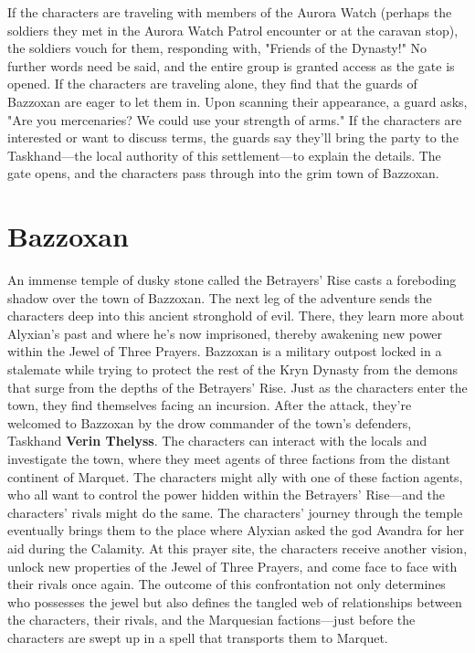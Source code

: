 \documentclass[10pt,a4,twoside,twocolumn,openany,nodeprecatedcode]{dndbook}
\begin{document}
If the characters are traveling with members of the Aurora Watch (perhaps the soldiers they met in the Aurora Watch Patrol encounter or at the caravan stop), the soldiers vouch for them, responding with, "Friends of the Dynasty!" No further words need be said, and the entire group is granted access as the gate is opened.
If the characters are traveling alone, they find that the guards of Bazzoxan are eager to let them in. Upon scanning their appearance, a guard asks, "Are you mercenaries? We could use your strength of arms." If the characters are interested or want to discuss terms, the guards say they'll bring the party to the Taskhand—the local authority of this settlement—to explain the details. The gate opens, and the characters pass through into the grim town of Bazzoxan.
\chapter{Bazzoxan}
An immense temple of dusky stone called the Betrayers' Rise casts a foreboding shadow over the town of Bazzoxan. The next leg of the adventure sends the characters deep into this ancient stronghold of evil. There, they learn more about Alyxian's past and where he's now imprisoned, thereby awakening new power within the Jewel of Three Prayers.
Bazzoxan is a military outpost locked in a stalemate while trying to protect the rest of the Kryn Dynasty from the demons that surge from the depths of the Betrayers' Rise. Just as the characters enter the town, they find themselves facing an incursion. After the attack, they're welcomed to Bazzoxan by the drow commander of the town's defenders, Taskhand \textbf{Verin Thelyss}.
The characters can interact with the locals and investigate the town, where they meet agents of three factions from the distant continent of Marquet. The characters might ally with one of these faction agents, who all want to control the power hidden within the Betrayers' Rise—and the characters' rivals might do the same. The characters' journey through the temple eventually brings them to the place where Alyxian asked the god Avandra for her aid during the Calamity.
At this prayer site, the characters receive another vision, unlock new properties of the Jewel of Three Prayers, and come face to face with their rivals once again. The outcome of this confrontation not only determines who possesses the jewel but also defines the tangled web of relationships between the characters, their rivals, and the Marquesian factions—just before the characters are swept up in a spell that transports them to Marquet.
\end{document}
